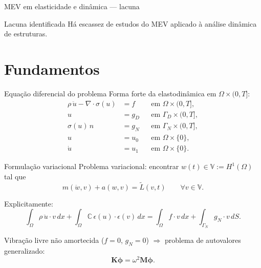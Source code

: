 \documentclass[aspectratio=169]{beamer}
\begin{document}
{\begin{frame}{MEV em elasticidade e dinâmica --- lacuna}
  \vspace{0.7em}
  \begin{alertblock}{Lacuna identificada}
    Há escassez de estudos do MEV aplicado à análise dinâmica de estruturas. 
  \end{alertblock}
\end{frame}

\section{Fundamentos}

\begin{frame}{Equação diferencial do problema}
  Forma forte da elastodinâmica em $\Omega\times(0,T]$:
  \begin{align*}
    \rho\,\ddot{u} - \nabla\cdot\sigma(u) &= f && \text{em }\Omega\times(0,T], \\
    u &= g_D && \text{em }\Gamma_D\times(0,T], \\
    \sigma(u)\,n &= g_N && \text{em }\Gamma_N\times(0,T], \\
    u &= u_0 && \text{em }\Omega\times\{0\}, \\
    \dot{u} &= u_1 && \text{em }\Omega\times\{0\}.
  \end{align*}
\end{frame}

\begin{frame}{Formulação variacional}
  Problema variacional: encontrar $w(t)\in\mathbb{V}:=H^1(\Omega)$ tal que
  \[
    m(\ddot{w},v) + a(w,v) = \tilde{L}(v,t)
    \qquad\forall v\in\mathbb{V}.
  \]

  Explicitamente:
  \[
    \int_\Omega\rho\,\ddot{u}\cdot v\,dx
    + \int_\Omega\mathbb{C}\,\epsilon (u) \cdot \epsilon (v)\,dx
    = \int_\Omega f\cdot v\,dx
    + \int_{\Gamma_N}g_N\cdot v\,dS.
  \]

  \vspace{0.3em}
  Vibração livre não amortecida ($f=0$, $g_N=0$) $\Rightarrow$
  problema de autovalores generalizado:
  \[
    \mathbf{K}\boldsymbol{\phi} = \omega^2\mathbf{M}\boldsymbol{\phi}.
  \]
\end{frame}


}
\end{document}
